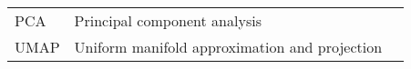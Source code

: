 \scriptsize

\begin{table}[!h]
\vspace{-2.0cm}
\hspace{1.0cm}
\begin{tabular}{l l r}

\textsc{PCA}  & Principal component analysis \\ [1ex]
\textsc{UMAP}  &  Uniform manifold approximation and projection \\ [1ex]



\end{tabular}
\end{table}










